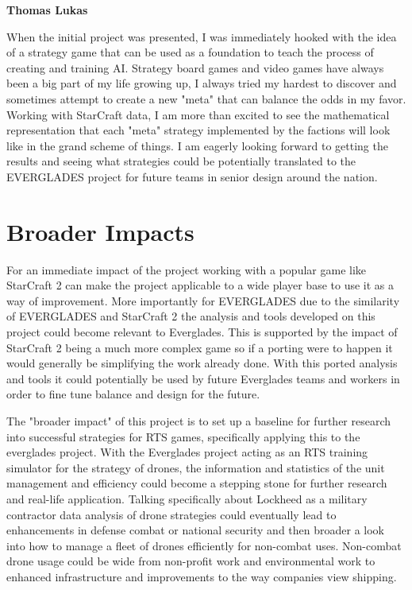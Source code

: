 \documentclass[a4paper,12pt]{report}
\newcommand{\msection}[1]{\noindent\textbf{#1}}
\begin{document}
\msection{Thomas Lukas}

When the initial project was presented, I was immediately hooked with the idea of a strategy game that can be used as a foundation to teach the process of creating and training AI. Strategy board games and video games have always been a big part of my life growing up, I always tried my hardest to discover and sometimes attempt to create a new "meta" that can balance the odds in my favor. Working with StarCraft data, I am more than excited to see the mathematical representation that each "meta" strategy implemented by the factions will look like in the grand scheme of things. I am eagerly looking forward to getting the results and seeing what strategies could be potentially translated to the EVERGLADES project for future teams in senior design around the nation.

\section{Broader Impacts}

For an immediate impact of the project working with a popular game like StarCraft 2 can make the project applicable to a wide player base to use it as a way of improvement. More importantly for EVERGLADES due to the similarity of EVERGLADES and StarCraft 2 the analysis and tools developed on this project could become relevant to Everglades. This is supported by the impact of StarCraft 2 being a much more complex game so if a porting were to happen it would generally be simplifying the work already done. With this ported analysis and tools it could potentially be used by future Everglades teams and workers in order to fine tune balance and design for the future.

The "broader impact" of this project is to set up a baseline for further research into successful strategies for RTS games, specifically applying this to the everglades project. With the Everglades project acting as an RTS training simulator for the strategy of drones, the information and statistics of the unit management and efficiency could become a stepping stone for further research and real-life application. Talking specifically about Lockheed as a military contractor data analysis of drone strategies could eventually lead to enhancements in defense combat or national security and then broader a look into how to manage a fleet of drones efficiently for non-combat uses. Non-combat drone usage could be wide from non-profit work and environmental work to enhanced infrastructure and improvements to the way companies view shipping.
\end{document}
